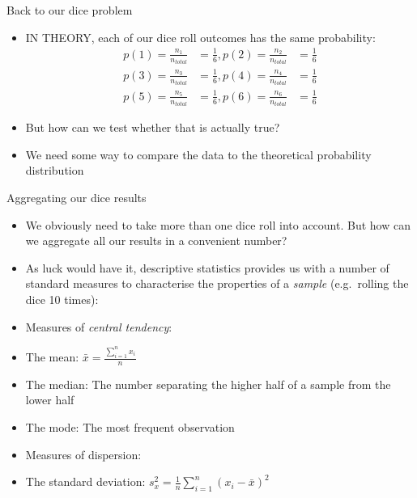 \begin{frame}{Back to our dice problem}

\begin{itemize}
\itemsep1pt\parskip0pt
\item
  IN THEORY, each of our dice roll outcomes has the same probability:
  \[ 
  \begin{aligned}
  p(1) = \frac{n_1}{n_{total}} &= \frac{1}{6},
  p(2) = \frac{n_2}{n_{total}} &= \frac{1}{6}\\
  p(3) = \frac{n_3}{n_{total}} &= \frac{1}{6},
  p(4) = \frac{n_4}{n_{total}} &= \frac{1}{6}\\ 
  p(5) = \frac{n_5}{n_{total}} &= \frac{1}{6},
  p(6) = \frac{n_6}{n_{total}} &= \frac{1}{6}
  \end{aligned}
  \]
\item
  But how can we test whether that is actually true?
\item
  We need some way to compare the data to the theoretical probability
  distribution
\end{itemize}

\end{frame}

\begin{frame}{Aggregating our dice results}

\begin{itemize}
\itemsep1pt\parskip0pt
\item
  We obviously need to take more than one dice roll into account. But
  how can we aggregate all our results in a convenient number?
\item
  As luck would have it, descriptive statistics provides us with a
  number of standard measures to characterise the properties of a
  \emph{sample} (e.g.~rolling the dice 10 times):
\item
  Measures of \emph{central tendency}:
\item
  The mean: \(\bar{x}=\frac{\sum_{i=1}^{n} x_i}{n}\)
\item
  The median: The number separating the higher half of a sample from the
  lower half
\item
  The mode: The most frequent observation
\item
  Measures of dispersion:
\item
  The standard deviation:
  \(s_x^2 = \frac{1}{n} \sum_{i=1}^n (x_i - \bar{x})^2\)
\end{itemize}

\end{frame}

